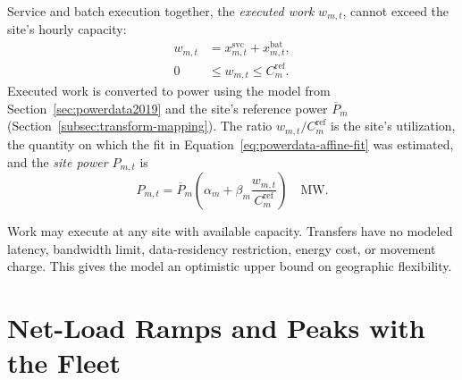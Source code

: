 \documentclass{UNCC-thesis}
\begin{document}
Service and batch execution together, the \emph{executed work}
\(w_{m,t}\), cannot exceed the site's hourly capacity:
\begin{align}
  w_{m,t}
  &=
  x^{\mathrm{svc}}_{m,t}
  +x^{\mathrm{bat}}_{m,t},
  \label{eq:executed-work}\\
  0
  &\leq w_{m,t}\leq C^{\mathrm{ref}}_m.
  \label{eq:site-capacity}
\end{align}
Executed work is converted to power using the model from
Section~\ref{sec:powerdata2019} and the site's reference power
\(\overline P_m\) (Section~\ref{subsec:transform-mapping}). The ratio \(w_{m,t}/C^{\mathrm{ref}}_m\) is the
site's utilization, the quantity on which the fit in
Equation~\eqref{eq:powerdata-affine-fit} was estimated, and the \emph{site
power} \(P_{m,t}\) is
\begin{equation}
  P_{m,t}
  =
  \overline P_m
  \left(
    \alpha_m+\beta_m\frac{w_{m,t}}{C^{\mathrm{ref}}_m}
  \right)
  \quad\mathrm{MW}.
  \label{eq:runtime-power}
\end{equation}

Work may execute at any site with available capacity. Transfers have no
modeled latency, bandwidth limit, data-residency restriction, energy cost,
or movement charge. This gives the model an optimistic upper bound on
geographic flexibility.

\section{Net-Load Ramps and Peaks with the Fleet}
\label{subsec:problem-objective}
\end{document}
